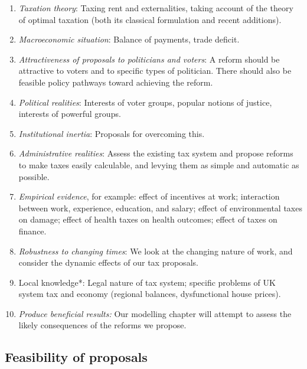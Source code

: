 \documentclass[]{tufte-handout}
\providecommand{\tightlist}{%
  \setlength{\itemsep}{0pt}\setlength{\parskip}{0pt}}
\begin{document}
\begin{enumerate}
\def\labelenumi{\arabic{enumi}.}
\tightlist
\item
  \emph{Taxation theory}: Taxing rent and externalities, taking account
  of the theory of optimal taxation (both its classical formulation and
  recent additions).\\
\item
  \emph{Macroeconomic situation}: Balance of payments, trade deficit.\\
\item
  \emph{Attractiveness of proposals to politicians and voters}: A reform
  should be attractive to voters and to specific types of politician.
  There should also be feasible policy pathways toward achieving the
  reform.
\item
  \emph{Political realities}: Interests of voter groups, popular notions
  of justice, interests of powerful groups.
\item
  \emph{Institutional inertia}: Proposals for overcoming this.\\
\item
  \emph{Administrative realities}: Assess the existing tax system and
  propose reforms to make taxes easily calculable, and levying them as
  simple and automatic as possible.\\
\item
  \emph{Empirical evidence}, for example: effect of incentives at work;
  interaction between work, experience, education, and salary; effect of
  environmental taxes on damage; effect of health taxes on health
  outcomes; effect of taxes on finance.\\
\item
  \emph{Robustness to changing times}: We look at the changing nature of
  work, and consider the dynamic effects of our tax proposals.
\item
  Local knowledge*: Legal nature of tax system; specific problems of UK
  system tax and economy (regional balances, dysfunctional house
  prices).\\
\item
  \emph{Produce beneficial results:} Our modelling chapter will attempt
  to assess the likely consequences of the reforms we propose.
\end{enumerate}

\hypertarget{feasibility-of-proposals}{%
\subsection{\texorpdfstring{\textbf{Feasibility of
proposals}}{Feasibility of proposals}}\label{feasibility-of-proposals}}
\end{document}
